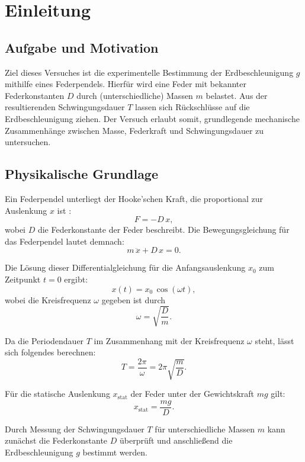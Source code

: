 \chapter{Einleitung}

\section{Aufgabe und Motivation}
Ziel dieses Versuches ist die experimentelle Bestimmung der Erdbeschleunigung $g$ mithilfe eines Federpendels. Hierfür wird eine Feder mit bekannter Federkonstanten $D$ durch (unterschiedliche) Massen $m$ belastet. Aus der resultierenden Schwingungsdauer $T$ lassen sich Rückschlüsse auf die Erdbeschleunigung ziehen. Der Versuch erlaubt somit, grundlegende mechanische Zusammenhänge zwischen Masse, Federkraft und Schwingungsdauer zu untersuchen.

\section{Physikalische Grundlage}
Ein Federpendel unterliegt der Hooke'schen Kraft, die proportional zur Auslenkung $x$ ist \cite{skript25,demtroeder17}:
\begin{equation}
    F = -D \, x,
\end{equation}
wobei $D$ die Federkonstante der Feder beschreibt. Die Bewegungsgleichung für das Federpendel lautet demnach:
\begin{equation}
    m \, \ddot{x} + D \, x = 0.
\end{equation}

Die Lösung dieser Differentialgleichung für die Anfangsauslenkung $x_0$ zum Zeitpunkt $t = 0$ ergibt:
\begin{equation}
    x(t) = x_0 \, \cos(\omega t),
\end{equation}
wobei die Kreisfrequenz $\omega$ gegeben ist durch
\begin{equation}
    \omega = \sqrt{\frac{D}{m}}.
\end{equation}

Da die Periodendauer $T$ im Zusammenhang mit der Kreisfrequenz $\omega$ steht, lässt sich folgendes berechnen:
\begin{equation}
    T = \frac{2 \pi}{\omega} = 2 \pi \sqrt{\frac{m}{D}}.
\end{equation}

Für die statische Auslenkung $x_\text{stat}$ der Feder unter der Gewichtskraft $mg$ gilt:
\begin{equation}
    x_\text{stat} = \frac{mg}{D}.
\end{equation}

Durch Messung der Schwingungsdauer $T$ für unterschiedliche Massen $m$ kann zunächst die Federkonstante $D$ überprüft und anschließend die Erdbeschleunigung $g$ bestimmt werden. 